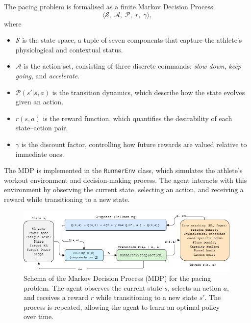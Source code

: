 The pacing problem is formalised as a finite Markov Decision Process  
\[
\langle \mathcal{S},\; \mathcal{A},\; \mathcal{P},\; r,\; \gamma \rangle,
\]
where  
\begin{itemize}
  \item \(\mathcal{S}\) is the state space, a tuple of seven components that capture the athlete’s physiological and contextual status.
  \item \(\mathcal{A}\) is the action set, consisting of three discrete commands: \emph{slow down}, \emph{keep going}, and \emph{accelerate}.
  \item \(\mathcal{P}(s'|s,a)\) is the transition dynamics, which describe how the state evolves given an action.
  \item \(r(s,a)\) is the reward function, which quantifies the desirability of each state–action pair.
  \item \(\gamma\) is the discount factor, controlling how future rewards are valued relative to immediate ones.
\end{itemize}

The MDP is implemented in the \texttt{RunnerEnv} class, which simulates the athlete's workout environment and decision-making process. The agent interacts with this environment by observing the current state, selecting an action, and receiving a reward while transitioning to a new state.

\begin{figure}[H]
\centering
\includegraphics[width=0.99\textwidth]{images/draw_mdp.png}
\caption{Schema of the Markov Decision Process (MDP) for the pacing problem. The agent observes the current state \(s\), selects an action \(a\), and receives a reward \(r\) while transitioning to a new state \(s'\). The process is repeated, allowing the agent to learn an optimal policy over time.}
\label{fig:mdp_diagram}
\end{figure}

